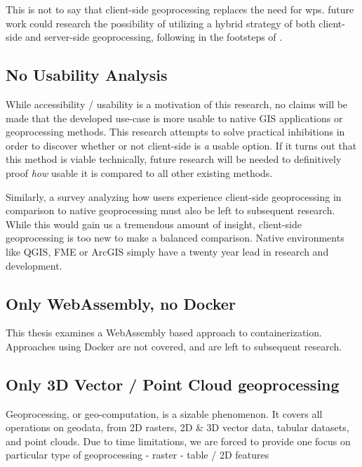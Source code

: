 This is not to say that client-side geoprocessing replaces the need for \ac{wps}. 
future work could research the possibility of utilizing a hybrid strategy of both client-side and server-side geoprocessing, following in the footsteps of \cite{panidi_hybrid_2015}. 

\subsection*{ No Usability Analysis } %
While accessibility / usability is a motivation of this research, no claims will be made that the developed use-case is more usable to native GIS applications or geoprocessing methods. This research attempts to solve practical inhibitions in order to discover whether or not client-side is \emph{a} usable option. If it turns out that this method is viable technically, future research will be needed to definitively proof \emph{how} usable it is compared to all other existing methods.  


Similarly, a survey analyzing how users experience client-side geoprocessing in comparison to native geoprocessing must also be left to subsequent research. While this would gain us a tremendous amount of insight, client-side geoprocessing is too new to make a balanced comparison. Native environments like QGIS, FME or ArcGIS simply have a twenty year lead in research and development. 



\subsection {Only WebAssembly, no Docker}
This thesis examines a WebAssembly based approach to containerization. Approaches using Docker are not covered, and are left to subsequent research.

\subsection*{ Only 3D Vector / Point Cloud geoprocessing}
Geoprocessing, or geo-computation, is a sizable phenomenon. 
It covers all operations on geodata, from 2D rasters, 2D \& 3D vector data, tabular datasets, and point clouds. 
Due to time limitations, we are forced to provide one focus on particular type of geoprocessing
- raster
- table / 2D features


